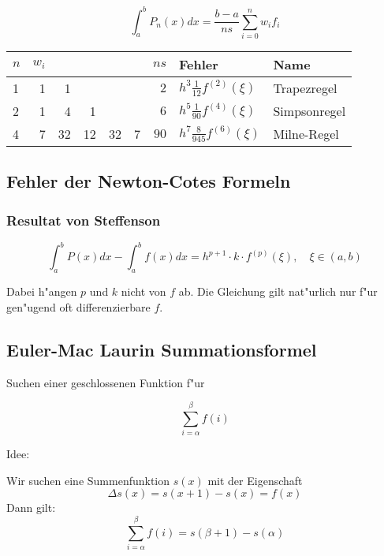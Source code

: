 \documentclass[german, 10pt, a4paper, twocolumn]{scrartcl}
\theoremstyle{definition}
\begin{document}
\begin{displaymath}
	\int^b_a P_n(x) dx = \frac{b-a}{ns}\sum^n_{i=0} w_i f_i
\end{displaymath}

\small
\begin{tabular}{lrrrrrrll}
	\hline
	$n$ &		$w_i$ & & & & &			$ns$ &		Fehler &		Name\\ \hline

	1 &		1 & 1 & & & & 			$2$ &		$h^3 \frac{1}{12}f^{(2)}(\xi)$ &	Trapezregel \\
	2 &		1 & 4 & 1& & & 			$6$ &		$h^5 \frac{1}{90}f^{(4)}(\xi)$ &	Simpsonregel \\
	4 &		7 & 32 & 12& 32& 7& 		$90$ &		$h^7 \frac{8}{945}f^{(6)}(\xi)$ &	Milne-Regel \\ \hline
\end{tabular}
\normalsize

\subsection{Fehler der Newton-Cotes Formeln}

\subsubsection{Resultat von Steffenson}

\begin{displaymath}
	\int^b_a P(x) dx - \int^b_a f(x) dx = h^{p+1} \cdotp k \cdotp f^{(p)}(\xi),\quad \xi \in (a,b)
\end{displaymath}

Dabei h"angen $p$ und $k$ nicht von $f$ ab. Die Gleichung gilt nat"urlich nur f"ur gen"ugend oft differenzierbare $f$.

\subsection{Euler-Mac Laurin Summationsformel}

Suchen einer geschlossenen Funktion f"ur

\begin{displaymath}
	\sum^\beta_{i=\alpha} f(i)
\end{displaymath}

\begin{labeling}{Idee: }
	\item[\usekomafont{descriptionlabel}Idee:] Wir suchen eine Summenfunktion $s(x)$ mit der Eigenschaft
		\begin{displaymath}
			\Delta s(x)  = s(x+1) - s(x) = f(x)
		\end{displaymath}
		Dann gilt:
		\begin{displaymath}
			\sum^\beta_{i=\alpha} f(i) = s(\beta + 1) - s(\alpha)
		\end{displaymath}
\end{labeling}
\end{document}
